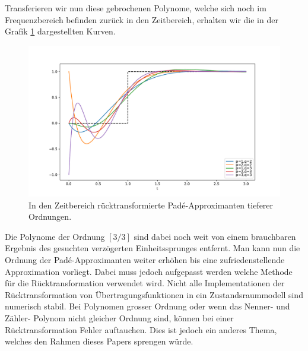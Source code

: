 Transferieren wir nun diese gebrochenen Polynome, welche sich noch im Frequenzbereich befinden zurück in den Zeitbereich, erhalten wir die in der Grafik \ref{pade:totzeitexp2} dargestellten Kurven.

\begin{figure}[!h]
	\centering
	\includegraphics[width=1\linewidth]{./papers/pade/python/bilder/padelow33.pdf}
	\caption{In den Zeitbereich rücktransformierte Padé-Approximanten tieferer Ordnungen\label{pade:totzeitexp2}.}
\end{figure}

Die Polynome der Ordnung $[3/3]$ sind dabei noch weit von einem brauchbaren Ergebnis des gesuchten verzögerten Einheitssprunges entfernt.
Man kann nun die Ordnung der Padé-Approximanten weiter erhöhen bis eine zufriedenstellende Approximation vorliegt.
Dabei muss jedoch aufgepasst werden welche Methode für die Rücktransformation verwendet wird.
Nicht alle Implementationen der Rücktransformation von Übertragungsfunktionen in ein Zustandsraummodell sind numerisch stabil. 
Bei Polynomen grosser Ordnung oder wenn das Nenner- und Zähler- Polynom nicht gleicher Ordnung sind, können bei einer Rücktransformation Fehler auftauchen.
Dies ist jedoch ein anderes Thema, welches den Rahmen dieses Papers sprengen würde.


